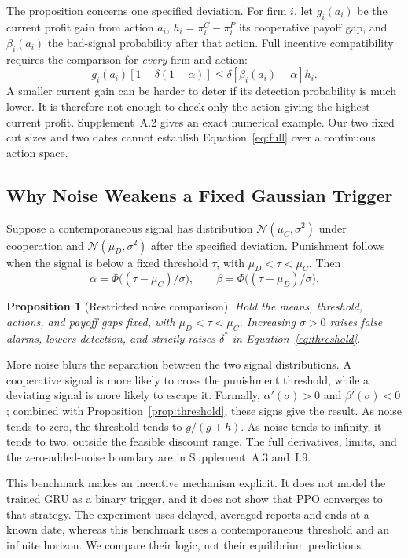 \documentclass{article}
\newtheorem{proposition}{Proposition}
\begin{document}
The proposition concerns one specified deviation. For firm $i$, let $g_i(a_i)$ be the current profit gain from action $a_i$, $h_i=\pi_i^C-\pi_i^P$ its cooperative payoff gap, and $\beta_i(a_i)$ the bad-signal probability after that action. Full incentive compatibility requires the comparison for \emph{every} firm and action:
\begin{equation}
g_i(a_i)[1-\delta(1-\alpha)]\le\delta[\beta_i(a_i)-\alpha]h_i.
\label{eq:full}
\end{equation}
A smaller current gain can be harder to deter if its detection probability is much lower. It is therefore not enough to check only the action giving the highest current profit. Supplement~A.2 gives an exact numerical example. Our two fixed cut sizes and two dates cannot establish Equation~\eqref{eq:full} over a continuous action space.

\subsection{Why Noise Weakens a Fixed Gaussian Trigger}

Suppose a contemporaneous signal has distribution $\mathcal N(\mu_C,\sigma^2)$ under cooperation and $\mathcal N(\mu_D,\sigma^2)$ after the specified deviation. Punishment follows when the signal is below a fixed threshold $\tau$, with $\mu_D<\tau<\mu_C$. Then
\[
\alpha=\Phi\bigl((\tau-\mu_C)/\sigma\bigr),\qquad
\beta=\Phi\bigl((\tau-\mu_D)/\sigma\bigr).
\]
\begin{proposition}[Restricted noise comparison]\label{prop:gauss}
Hold the means, threshold, actions, and payoff gaps fixed, with $\mu_D<\tau<\mu_C$. Increasing $\sigma>0$ raises false alarms, lowers detection, and strictly raises $\delta^*$ in Equation~\eqref{eq:threshold}.
\end{proposition}

More noise blurs the separation between the two signal distributions. A cooperative signal is more likely to cross the punishment threshold, while a deviating signal is more likely to escape it. Formally, $\alpha'(\sigma)>0$ and $\beta'(\sigma)<0$; combined with Proposition~\ref{prop:threshold}, these signs give the result. As noise tends to zero, the threshold tends to $g/(g+h)$. As noise tends to infinity, it tends to two, outside the feasible discount range. The full derivatives, limits, and the zero-added-noise boundary are in Supplement~A.3 and~I.9.

This benchmark makes an incentive mechanism explicit. It does not model the trained GRU as a binary trigger, and it does not show that PPO converges to that strategy. The experiment uses delayed, averaged reports and ends at a known date, whereas this benchmark uses a contemporaneous threshold and an infinite horizon. We compare their logic, not their equilibrium predictions.
\end{document}

